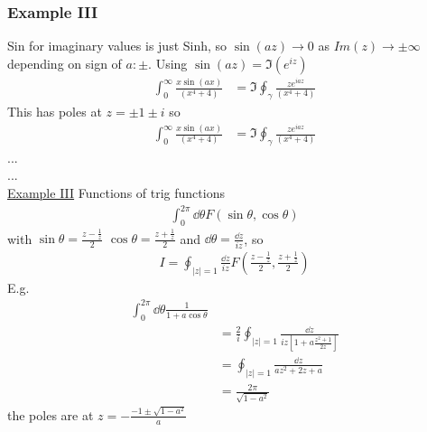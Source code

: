 \documentclass[a4paper,12pt]{article}
\begin{document}
\subsubsection{Example III}
Sin for imaginary values is just Sinh, so $\sin(a z)\to 0$ as $Im(z)\to \pm\infty$ depending on sign of $a:\pm$. Using $\sin(az)=\Im(e^{iz})$
\begin{equation}
	\begin{aligned}
		\int_{0}^{\infty}\frac{x \sin(a x)}{(x^4+4)}&=\Im \oint_\gamma \frac{z e^{iaz}}{(x^4+4)}
	\end{aligned}
\end{equation}
This has poles at $z=\pm 1 \pm i$ so
\begin{equation}
	\begin{aligned}
		\int_{0}^{\infty}\frac{x \sin(a x)}{(x^4+4)}&=\Im \oint_\gamma \frac{z e^{iaz}}{(x^4+4)}
	\end{aligned}
\end{equation}
...\\
...\\
\underline{Example III}
Functions of trig functions
\begin{equation}
	\begin{aligned}
		\int_{0}^{2\pi} \dd \theta F(\sin \theta, \cos \theta )
	\end{aligned}
\end{equation}
with $\sin\theta = \frac{z-\frac{1}{z}}{2}$ $\cos\theta = \frac{z+\frac{1}{z}}{2}$ and $\dd \theta=\frac{\dd z}{iz}$, so
\begin{equation}
	\begin{aligned}
		I=\oint_{|z|=1} \frac{\dd z}{iz} F(\frac{z-\frac{1}{z}}{2}, \frac{z+\frac{1}{z}}{2} )
	\end{aligned}
\end{equation}
E.g.
\begin{equation}
	\begin{aligned}
		\int_{0}^{2\pi} \dd \theta \frac{1}{1+a\cos \theta}\\
		&=\frac{2}{i}\oint_{|z|=1} \frac{\dd z}{iz\left[1+a\frac{z^2+1}{2z}\right]}\\
		&=\oint_{|z|=1} \frac{\dd z}{az^2+2z+a}\\
		&=\frac{2\pi}{\sqrt{1-a^2}}
	\end{aligned}
\end{equation}
the poles are at $z=-\frac{-1\pm\sqrt{1-a^2}}{a}$
\end{document}
